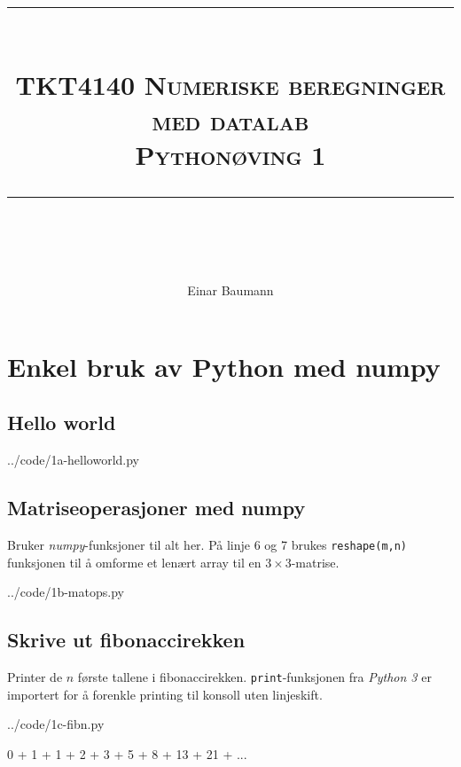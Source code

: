 




\author{Einar Baumann}
\title{
    \vspace{-1in}
    \vspace{0.1in}
    \rule{\textwidth}{0.5pt} \\[0.5cm]
    \normalfont \normalsize \textsc{TKT4140 Numeriske beregninger med datalab} \\ [20pt]
    {\textsc{ \huge Pythonøving 1}} \\
    \vspace{0.1in}
    \rule{\textwidth}{2pt} \\[0.7cm]
}


\maketitle
\thispagestyle{empty}
\clearpage

\section{Enkel bruk av Python med numpy} %
\label{sec:enkel_bruk_av_numpy}


\subsection{Hello world} %
\label{sub:hello_world}

  {../code/1a-helloworld.py}


\subsection{Matriseoperasjoner med numpy} %
\label{sub:matriseoperasjoner_med_numpy}
Bruker \emph{numpy}-funksjoner til alt her. På linje 6 og 7 brukes \texttt{reshape(m,n)} funksjonen til å omforme et lenært array til en $3\times 3$-matrise.

  {../code/1b-matops.py}


\subsection{Skrive ut fibonaccirekken} %
\label{sub:skrive_ut_fibonaccirekken}
Printer de $n$ første tallene i fibonaccirekken. \texttt{print}-funksjonen fra \emph{Python 3} er importert for å forenkle printing til konsoll uten linjeskift.

  {../code/1c-fibn.py}
\vspace{-1.2em}
\begin{programoutput}
0 + 1 + 1 + 2 + 3 + 5 + 8 + 13 + 21 + ...
\end{programoutput}


